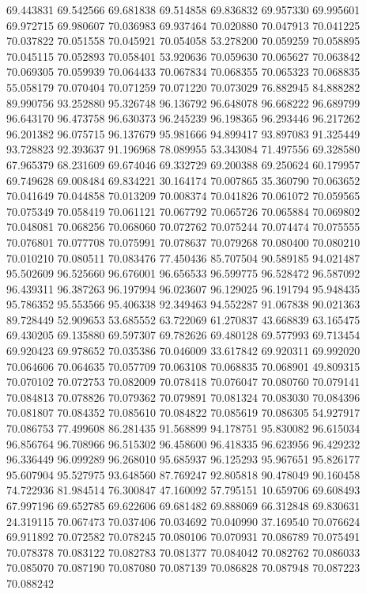 69.443831
69.542566
69.681838
69.514858
69.836832
69.957330
69.995601
69.972715
69.980607
70.036983
69.937464
70.020880
70.047913
70.041225
70.037822
70.051558
70.045921
70.054058
53.278200
70.059259
70.058895
70.045115
70.052893
70.058401
53.920636
70.059630
70.065627
70.063842
70.069305
70.059939
70.064433
70.067834
70.068355
70.065323
70.068835
55.058179
70.070404
70.071259
70.071220
70.073029
76.882945
84.888282
89.990756
93.252880
95.326748
96.136792
96.648078
96.668222
96.689799
96.643170
96.473758
96.630373
96.245239
96.198365
96.293446
96.217262
96.201382
96.075715
96.137679
95.981666
94.899417
93.897083
91.325449
93.728823
92.393637
91.196968
78.089955
53.343084
71.497556
69.328580
67.965379
68.231609
69.674046
69.332729
69.200388
69.250624
60.179957
69.749628
69.008484
69.834221
30.164174
70.007865
35.360790
70.063652
70.041649
70.044858
70.013209
70.008374
70.041826
70.061072
70.059565
70.075349
70.058419
70.061121
70.067792
70.065726
70.065884
70.069802
70.048081
70.068256
70.068060
70.072762
70.075244
70.074474
70.075555
70.076801
70.077708
70.075991
70.078637
70.079268
70.080400
70.080210
70.010210
70.080511
70.083476
77.450436
85.707504
90.589185
94.021487
95.502609
96.525660
96.676001
96.656533
96.599775
96.528472
96.587092
96.439311
96.387263
96.197994
96.023607
96.129025
96.191794
95.948435
95.786352
95.553566
95.406338
92.349463
94.552287
91.067838
90.021363
89.728449
52.909653
53.685552
63.722069
61.270837
43.668839
63.165475
69.430205
69.135880
69.597307
69.782626
69.480128
69.577993
69.713454
69.920423
69.978652
70.035386
70.046009
33.617842
69.920311
69.992020
70.064606
70.064635
70.057709
70.063108
70.068835
70.068901
49.809315
70.070102
70.072753
70.082009
70.078418
70.076047
70.080760
70.079141
70.084813
70.078826
70.079362
70.079891
70.081324
70.083030
70.084396
70.081807
70.084352
70.085610
70.084822
70.085619
70.086305
54.927917
70.086753
77.499608
86.281435
91.568899
94.178751
95.830082
96.615034
96.856764
96.708966
96.515302
96.458600
96.418335
96.623956
96.429232
96.336449
96.099289
96.268010
95.685937
96.125293
95.967651
95.826177
95.607904
95.527975
93.648560
87.769247
92.805818
90.478049
90.160458
74.722936
81.984514
76.300847
47.160092
57.795151
10.659706
69.608493
67.997196
69.652785
69.622606
69.681482
69.888069
66.312848
69.830631
24.319115
70.067473
70.037406
70.034692
70.040990
37.169540
70.076624
69.911892
70.072582
70.078245
70.080106
70.070931
70.086789
70.075491
70.078378
70.083122
70.082783
70.081377
70.084042
70.082762
70.086033
70.085070
70.087190
70.087080
70.087139
70.086828
70.087948
70.087223
70.088242
